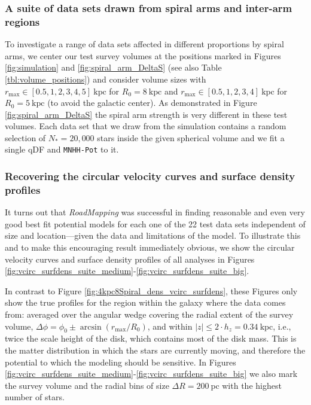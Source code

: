 \documentclass[iop,revtex4,numberedappendix,appendixfloats]{emulateapj}
\newcommand{\RM}{{\sl RoadMapping}}
\newcommand{\NEW}[1]{\textcolor{Green}{#1}}
\newcommand{\OLD}[1]{}
\begin{document}
\subsubsection{A suite of data sets drawn from spiral arms and inter-arm regions} \label{sec:suite}

To investigate a range of data sets affected in different proportions by spiral arms, we center our test survey volumes at the positions marked in Figures \ref{fig:simulation} and \ref{fig:spiral_arm_DeltaS} (see also Table \ref{tbl:volume_positions}) and consider volume sizes with $r_\text{max} \in [0.5,1,2,3,4,5]~\text{kpc}$ for $R_0 = 8~\text{kpc}$ and $r_\text{max} \in [0.5,1,2,3,4]~\text{kpc}$ for $R_0 = 5~\text{kpc}$ (to avoid the galactic center). As demonstrated in Figure \ref{fig:spiral_arm_DeltaS} the spiral arm strength is very different in these test volumes. Each data set that we draw from the simulation contains a random selection of $N_*=20,000$ stars inside the given spherical volume and we fit a single qDF and \texttt{MNHH-Pot} to it. 

\subsubsection{Recovering the circular velocity curves and surface density profiles} \label{sec:circvel_surfdens}

It turns out that \RM{} was successful in finding reasonable and even very good best fit potential models for each one of the 22 test data sets independent of size and location---given the data and limitations of the model. To illustrate this and to make this encouraging result immediately obvious, we \OLD{explicitly} show the circular velocity curves and surface density profiles of all analyses in Figures \ref{fig:vcirc_surfdens_suite_medium}-\ref{fig:vcirc_surfdens_suite_big}. 

In contrast to Figure \OLD{\ref{fig:4kpc8Spiral_vcirc_surfdens}}\NEW{\ref{fig:4kpc8Spiral_dens_vcirc_surfdens}}, these Figures only show the true profiles for the region within the galaxy where the data comes from: averaged over the angular wedge covering the radial extent of the survey volume, $\Delta \phi = \phi_0 \pm \arcsin(r_\text{max}/R_0)$, and within $|z| \leq 2 \cdot h_z = 0.34~\text{kpc}$, i.e., twice the scale height of the disk, which contains most of the disk mass. This is the matter distribution in which the stars are currently moving, and therefore the potential to which the modeling should be sensitive. In Figures \ref{fig:vcirc_surfdens_suite_medium}-\ref{fig:vcirc_surfdens_suite_big} we also mark the survey volume and the radial bins of size $\Delta R =200~\text{pc}$ with the highest number of stars. 
\end{document}
